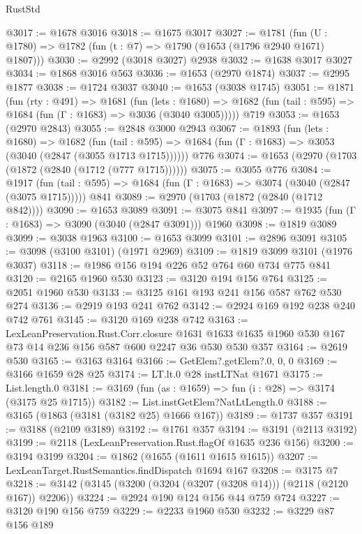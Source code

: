 \begin{lexlean}{RustStd}
\begin{coremodule}
@3017 := @1678 @3016
@3018 := @1675 @3017
@3027 := @1781 (fun (U : @1780) => @1782 (fun (t : @7) => @1790 (@1653 (@1796 @2940 @1671) @1807)))
@3030 := @2992 (@3018 @3027) @2938
@3032 := @1638 @3017 @3027
@3034 := @1868 @3016 @563
@3036 := @1653 (@2970 @1874)
@3037 := @2995 @1877
@3038 := @1724 @3037
@3040 := @1653 (@3038 @1745)
@3051 := @1871
    (fun (rty : @491) =>
    @1681
      (fun (lets : @1680) =>
      @1682 (fun (tail : @595) => @1684 (fun (Γ : @1683) => @3036 (@3040 @3005)))))
    @719
@3053 := @1653 (@2970 @2843)
@3055 := @2848 @3000 @2943
@3067 := @1893
    (fun (lets : @1680) =>
    @1682
      (fun (tail : @595) => @1684 (fun (Γ : @1683) => @3053 (@3040 (@2847 (@3055 @1713 @1715))))))
    @776
@3074 := @1653 (@2970 (@1703 (@1872 (@2840 (@1712 (@777 @1715))))))
@3075 := @3055 @776
@3084 := @1917
    (fun (tail : @595) => @1684 (fun (Γ : @1683) => @3074 (@3040 (@2847 (@3075 @1715)))))
    @841
@3089 := @2970 (@1703 (@1872 (@2840 (@1712 @842))))
@3090 := @1653 @3089
@3091 := @3075 @841
@3097 := @1935 (fun (Γ : @1683) => @3090 (@3040 (@2847 @3091))) @1960
@3098 := @1819 @3089
@3099 := @3038 @1963
@3100 := @1653 @3099
@3101 := @2896 @3091
@3105 := @3098 (@3100 @3101) (@1971 @2969)
@3109 := @1819 @3099 @3101 (@1976 @3037)
@3118 := @1986 @156 @194 @226 @52 @764 @60 @734 @775 @841
@3120 := @2165 @1960 @530
@3123 := @3120 @194 @156 @764
@3125 := @2051 @1960 @530
@3133 := @3125 @161 @193 @241 @156 @587 @762 @530 @274
@3136 := @2919 @193 @241 @762
@3142 := @2924 @169 @192 @238 @240 @742 @761
@3145 := @3120 @169 @238 @742
@3163 := LexLeanPreservation.Rust.Corr.closure
    @1631
    @1633
    @1635
    @1960
    @530
    @167
    @73
    @14
    @236
    @156
    @587
    @600
    @2247
    @36
    @530
    @530
    @357
@3164 := @2619 @530
@3165 := @3163 @3164
@3166 := GetElem?.getElem?.{0, 0, 0}
@3169 := @3166 @1659 @28 @25
@3174 := LT.lt.{0} @28 instLTNat @1671
@3175 := List.length.{0}
@3181 := @3169 (fun (as : @1659) => fun (i : @28) => @3174 (@3175 @25 @1715))
@3182 := List.instGetElem?NatLtLength.{0}
@3188 := @3165 (@1863 (@3181 (@3182 @25) @1666 @167))
@3189 := @1737 @357
@3191 := @3188 (@2109 @3189)
@3192 := @1761 @357
@3194 := @3191 (@2113 @3192)
@3199 := @2118 (LexLeanPreservation.Rust.flagOf @1635 @236 @156)
@3200 := @3194 @3199
@3204 := @1862 (@1655 (@1611 @1615 @1615))
@3207 := LexLeanTarget.RustSemantics.findDispatch @1694 @167
@3208 := @3175 @7
@3218 := @3142 (@3145 (@3200 (@3204 (@3207 (@3208 @14))) (@2118 (@2120 @167)) @2206))
@3224 := @2924 @190 @124 @156 @44 @759 @724
@3227 := @3120 @190 @156 @759
@3229 := @2233 @1960 @530
@3232 := @3229 @87 @156 @189

\end{coremodule}
\end{lexlean}
